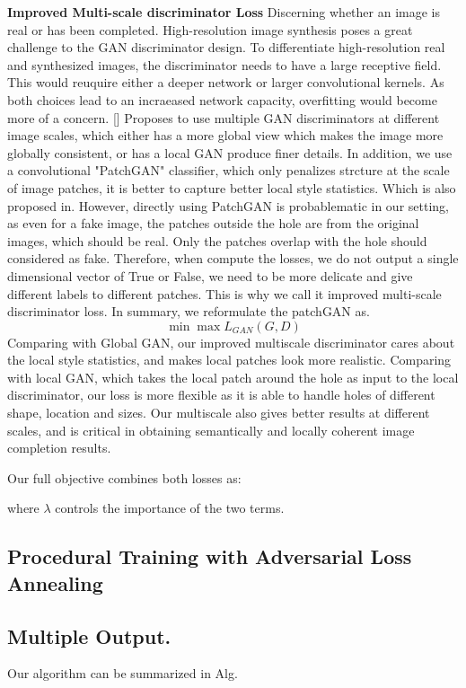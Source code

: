 \noindent\textbf{Improved Multi-scale discriminator Loss} Discerning whether an image is real or has been completed. High-resolution image synthesis poses a great challenge to the GAN discriminator design. To differentiate high-resolution real and synthesized images, the discriminator needs to have a large receptive field. This would reuquire either a deeper network or larger convolutional kernels. As both choices lead to an incraeased network capacity, overfitting would become more of a concern. [] Proposes to use multiple GAN discriminators at different image scales, which either has a more global view which makes the image more globally consistent, or has a local GAN produce finer details. In addition, we use a convolutional "PatchGAN" classifier, which only penalizes strcture at the scale of image patches, it is better to capture better local style statistics. Which is also proposed in. However, directly using PatchGAN is probablematic in our setting, as even for a fake image, the patches outside the hole are from the original images, which should be real. Only the patches overlap with the hole should considered as fake. Therefore, when compute the losses, we do not output a single dimensional vector of True or False, we need to be more delicate and give different labels to different patches. This is why we call it improved multi-scale discriminator loss. In summary, we reformulate the patchGAN as.
\[
\min\max L_{GAN}(G,D)
\]
Comparing with Global GAN, our improved multiscale discriminator cares about the local style statistics, and makes local patches look more realistic. Comparing with local GAN, which takes the local patch around the hole as input to the local discriminator, our loss is more flexible as it is able to handle holes of different shape, location and sizes. Our multiscale also gives better results at different scales, and is critical in obtaining semantically and locally coherent image completion results.

Our full objective combines both losses as:

where $\lambda$ controls the importance of the two terms.

\subsection{Procedural Training with Adversarial Loss Annealing}

\subsection{Multiple Output.}

Our algorithm can be summarized in Alg.
